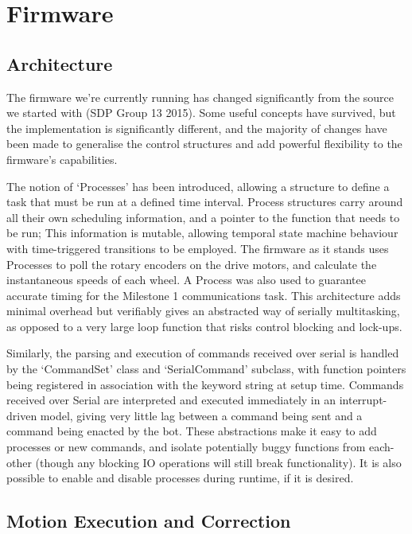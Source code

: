 %
%

\section{Firmware}

\subsection{Architecture}

The firmware we're currently running has changed significantly from the source we started with (SDP Group 13 2015). Some useful concepts have survived, but the implementation is significantly different, and the majority of changes have been made to generalise the control structures and add powerful flexibility to the firmware's capabilities.

The notion of `Processes' has been introduced, allowing a structure to define a task that must be run at a defined time interval. Process structures carry around all their own scheduling information, and a pointer to the function that needs to be run; This information is mutable, allowing temporal state machine behaviour with time-triggered transitions to be employed. The firmware as it stands uses Processes to poll the rotary encoders on the drive motors, and calculate the instantaneous speeds of each wheel. A Process was also used to guarantee accurate timing for the Milestone 1 communications task. This architecture adds minimal overhead but verifiably gives an abstracted way of serially multitasking, as opposed to a very large loop function that risks control blocking and lock-ups.

Similarly, the parsing and execution of commands received over serial is handled by the `CommandSet' class and `SerialCommand' subclass, with function pointers being registered in association with the keyword string at setup time. Commands received over Serial are interpreted and executed immediately in an interrupt-driven model, giving very little lag between a command being sent and a command being enacted by the bot. These abstractions make it easy to add processes or new commands, and isolate potentially buggy functions from each-other (though any blocking IO operations will still break functionality). It is also possible to enable and disable processes during runtime, if it is desired. 

\subsection{Motion Execution and Correction}

